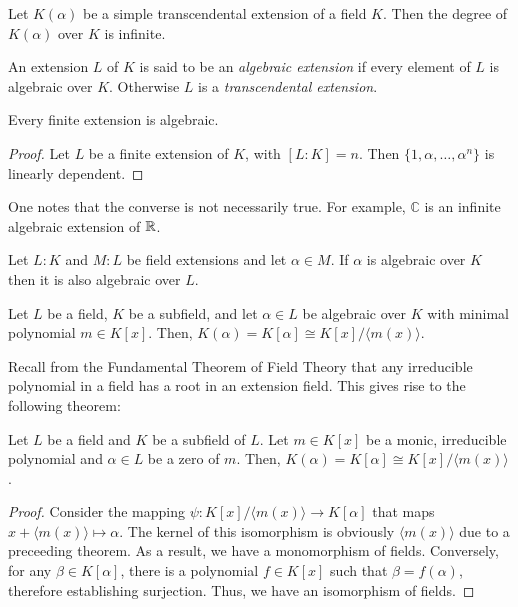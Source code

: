 \begin{theorem}
    Let $K(\alpha)$ be a simple transcendental extension of a field $K$. Then the degree of $K(\alpha)$ over $K$ is infinite.
\end{theorem}

\begin{definition}
    An extension $L$ of $K$ is said to be an \textit{algebraic extension} if every element of $L$ is algebraic over $K$. Otherwise $L$ is a \textit{transcendental extension}.
\end{definition}

\begin{lemma}
    Every finite extension is algebraic.
\end{lemma}
\begin{proof}
    Let $L$ be a finite extension of $K$, with $[L:K] = n$. Then $\{1,\alpha,\ldots,\alpha^n\}$ is linearly dependent.
\end{proof}

One notes that the converse is not necessarily true. For example, $\mathbb{C}$ is an infinite algebraic extension of $\mathbb{R}$.

\begin{corollary}
    Let $L:K$ and $M:L$ be field extensions and let $\alpha\in M$. If $\alpha$ is algebraic over $K$ then it is also algebraic over $L$.
\end{corollary}

\begin{theorem}
    Let $L$ be a field, $K$ be a subfield, and let $\alpha\in L$ be algebraic over $K$ with minimal polynomial $m\in K[x]$. Then, $K(\alpha) = K[\alpha]\cong K[x]/\langle m(x)\rangle$.
\end{theorem}

Recall from the Fundamental Theorem of Field Theory that any irreducible polynomial in a field has a root in an extension field. This gives rise to the following theorem:
\begin{theorem}
    Let $L$ be a field and $K$ be a subfield of $L$. Let $m\in K[x]$ be a monic, irreducible polynomial and $\alpha\in L$ be a zero of $m$. Then, $K(\alpha) = K[\alpha]\cong K[x]/\langle m(x)\rangle$.
\end{theorem}
\begin{proof}
    Consider the mapping $\psi:K[x]/\langle m(x)\rangle\to K[\alpha]$ that maps $x + \langle m(x)\rangle\mapsto\alpha$. The kernel of this isomorphism is obviously $\langle m(x)\rangle$ due to a preceeding theorem. As a result, we have a monomorphism of fields. Conversely, for any $\beta\in K[\alpha]$, there is a polynomial $f\in K[x]$ such that $\beta = f(\alpha)$, therefore establishing surjection. Thus, we have an isomorphism of fields.
\end{proof}

